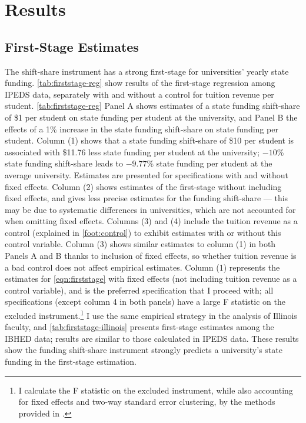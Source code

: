\section{Results}
\label{sec:results}

\subsection{First-Stage Estimates}
\label{sec:results-firststage}
The shift-share instrument has a strong first-stage for universities' yearly state funding.
\autoref{tab:firststage-reg} show results of the first-stage regression among IPEDS data, separately with and without a control for tuition revenue per student.
\autoref{tab:firststage-reg} Panel A shows estimates of a state funding shift-share of \$1 per student on state funding per student at the university, and Panel B the effects of a 1\% increase in the state funding shift-share on state funding per student.
Column (1) shows that a state funding shift-share of \$10 per student is associated with \$11.76 less state funding per student at the university; $-10$\% state funding shift-share leads to $-9.77$\% state funding per student at the average university.
Estimates are presented for specifications with and without fixed effects.
Column (2) shows estimates of the first-stage without including fixed effects, and gives less precise estimates for the funding shift-share --- this may be due to systematic differences in universities, which are not accounted for when omitting fixed effects.
Columns (3) and (4) include the tuition revenue as a control (explained in \autoref{foot:control}) to exhibit estimates with or without this control variable.
Column (3) shows similar estimates to column (1) in both Panels A and B thanks to inclusion of fixed effects, so whether tuition revenue is a bad control does not affect empirical estimates.
Column (1) represents the estimates for \autoref{eqn:firststage} with fixed effects (not including tuition revenue as a control variable), and is the preferred specification that I proceed with;
all specifications (except column 4 in both panels) have a large F statistic on the excluded instrument.\footnote{
    I calculate the F statistic on the excluded instrument, while also accounting for fixed effects and two-way standard error clustering, by the methods provided in \cite{olea2013robust}.
}
I use the same empirical strategy in the analysis of Illinois faculty, and \autoref{tab:firststage-illinois} presents first-stage estimates among the IBHED data; results are similar to those calculated in IPEDS data.
These results show the funding shift-share instrument strongly predicts a university's state funding in the first-stage estimation.

